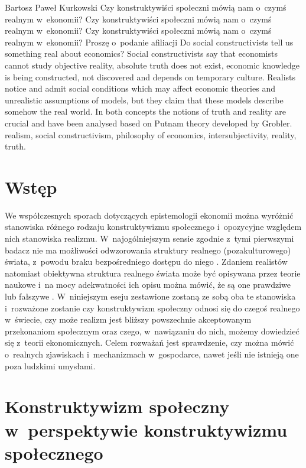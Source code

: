 \begin{artplenv}{Bartosz Paweł Kurkowski}
	{Czy konstruktywiści społeczni mówią nam o~czymś realnym w~ekonomii?}
	{Czy konstruktywiści społeczni mówią nam o~czymś realnym w~ekonomii?}
	{Czy konstruktywiści społeczni mówią nam o~czymś realnym w~ekonomii?}
	{Proszę o~podanie afiliacji}
	{Do social constructivists tell us something real about economics?}
	{Social constructivists say that economists cannot study objective reality, absolute truth does not exist, economic
		knowledge is being constructed, not discovered and depends on temporary culture. Realists notice and admit social
		conditions which may affect economic theories and unrealistic assumptions of models, but they claim that these models
		describe somehow the real world. In both concepts the notions of truth and reality are crucial and have been analysed
		based on Putnam theory developed by Grobler.}
	{realism, social constructivism, philosophy of economics, intersubjectivity, reality, truth.}



\section*{Wstęp}

We współczesnych sporach dotyczących epistemologii ekonomii można wyróżnić stanowiska różnego rodzaju konstruktywizmu
społecznego i~opozycyjne względem nich stanowiska realizmu. W~najogólniejszym sensie zgodnie z~tymi pierwszymi badacz
nie ma możliwości odwzorowania struktury realnego (pozakulturowego) świata, z~powodu braku bezpośredniego dostępu do
niego
\parencite[s.~30]{zboron_teorie_2009}.
Zdaniem realistów natomiast obiektywna struktura realnego świata
może być opisywana przez teorie naukowe i~na mocy adekwatności ich opisu można mówić, że są one prawdziwe lub fałszywe
\parencite[s.~74]{kincaid_realistic_2009}.
W~niniejszym eseju zestawione zostaną ze sobą oba te stanowiska i~rozważone
zostanie czy konstruktywizm społeczny odnosi się do czegoś realnego w~świecie, czy może realizm jest bliższy
powszechnie akceptowanym przekonaniom społecznym oraz czego, w~nawiązaniu do nich, możemy dowiedzieć się z~teorii
ekonomicznych. Celem rozważań jest sprawdzenie, czy można mówić o~realnych zjawiskach i~mechanizmach w~gospodarce,
nawet jeśli nie istnieją one poza ludzkimi umysłami.

\section{Konstruktywizm społeczny w~perspektywie konstruktywizmu społecznego}


\end{artplenv}
